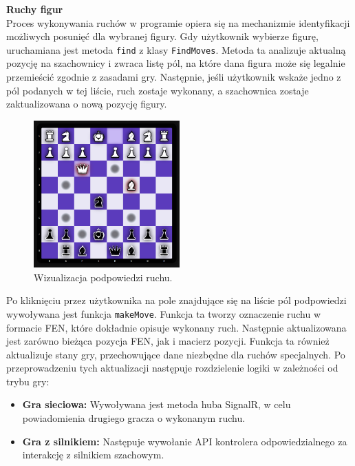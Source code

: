 \documentclass[twoside]{projektInzynierskiMS1}
\begin{document}
\noindent \textbf{Ruchy figur}\\
Proces wykonywania ruchów w programie opiera się na mechanizmie identyfikacji możliwych posunięć dla wybranej figury. Gdy użytkownik wybierze figurę, uruchamiana jest metoda \texttt{find} z klasy \texttt{FindMoves}. Metoda ta analizuje aktualną pozycję na szachownicy i zwraca listę pól, na które dana figura może się legalnie przemieścić zgodnie z zasadami gry. Następnie, jeśli użytkownik wskaże jedno z pól podanych w tej liście, ruch zostaje wykonany, a szachownica zostaje zaktualizowana o nową pozycję figury. 

\vspace{0.5cm}
\begin{figure}[h!]
    \centering
    \includegraphics[width=0.5\textwidth]{images/imp_move_tips.png}
    \caption{Wizualizacja podpowiedzi ruchu.}
\end{figure}
\vspace{0.5cm}

\noindent
Po kliknięciu przez użytkownika na pole znajdujące się na liście pól podpowiedzi wywoływana jest funkcja \texttt{makeMove}. Funkcja ta tworzy oznaczenie ruchu w formacie FEN, które dokładnie opisuje wykonany ruch. Następnie aktualizowana jest zarówno bieżąca pozycja FEN, jak i macierz pozycji. Funkcja ta również aktualizuje stany gry, przechowujące dane niezbędne dla ruchów specjalnych. Po przeprowadzeniu tych aktualizacji następuje rozdzielenie logiki w zależności od trybu gry:

\begin{itemize}
    \item \textbf{Gra sieciowa:} Wywoływana jest metoda huba SignalR, w celu powiadomienia drugiego gracza o wykonanym ruchu.
    \item \textbf{Gra z silnikiem:} Następuje wywołanie API kontrolera odpowiedzialnego za interakcję z silnikiem szachowym.
\end{itemize}
\end{document}
